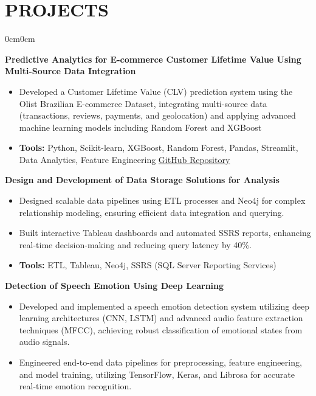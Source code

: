 \documentclass[10pt, letterpaper]{article}
\newenvironment{highlights}{
    \begin{itemize}[
        topsep=0.10cm,
        parsep=0.10cm,
        partopsep=0pt,
        itemsep=0pt,
        leftmargin=10pt
    ]
}{
    \end{itemize}
}
\newenvironment{onecolentry}{
    \begin{adjustwidth}{0cm}{0cm}
}{
    \end{adjustwidth}
}
\begin{document}
    \section{PROJECTS}
    \begin{onecolentry}
         \textbf{Predictive Analytics for E-commerce Customer Lifetime
Value Using Multi-Source Data Integration}
        \begin{highlights}
            \item Developed a Customer Lifetime Value (CLV) prediction system using the Olist Brazilian E-commerce Dataset, integrating multi-source data (transactions, reviews, payments, and geolocation) and applying advanced machine learning models including Random Forest and XGBoost
        \item \textbf{Tools:} Python, Scikit-learn, XGBoost, Random Forest, Pandas, Streamlit, Data Analytics, Feature Engineering
        \href{https://github.com/sooryanap/Predictive-Analaytics-of-E-commerce-Customer-lifetime-value}{GitHub Repository} \\
\vspace{2mm}
        \end{highlights}
        \textbf{Design and Development of Data Storage Solutions for Analysis}
        \begin{highlights}
            \item Designed scalable data pipelines using ETL processes and Neo4j for complex relationship modeling, ensuring efficient data integration and querying.
            \item Built interactive Tableau dashboards and automated SSRS reports, enhancing real-time decision-making and reducing query latency by 40\%.
            \item \textbf{Tools:} ETL, Tableau, Neo4j, SSRS (SQL Server Reporting Services)
        \end{highlights}
        \vspace{0.2cm}
        \textbf{Detection of Speech Emotion Using Deep Learning}
        \begin{highlights}
            \item Developed and implemented a speech emotion detection system utilizing deep learning architectures (CNN, LSTM) and advanced audio feature extraction techniques (MFCC), achieving robust classification of emotional states from audio signals.
            \item Engineered end-to-end data pipelines for preprocessing, feature engineering, and model training, utilizing TensorFlow, Keras, and Librosa for accurate real-time emotion recognition.

\end{highlights}
\end{onecolentry}
\end{document}
